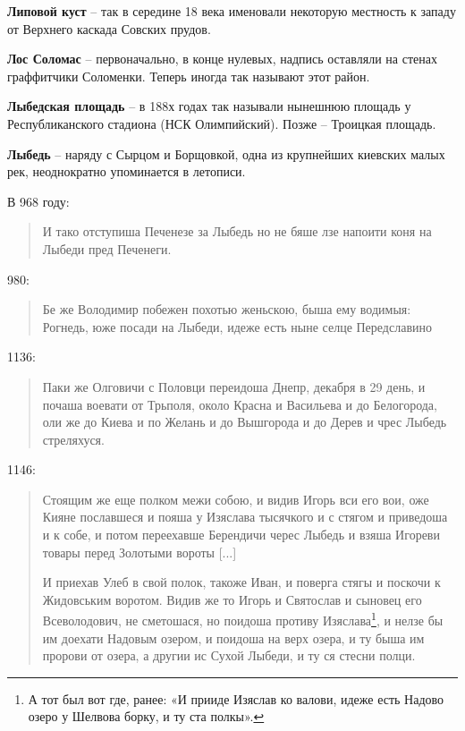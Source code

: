 \medskip

\textbf{Липовой куст} – так в середине 18 века именовали некоторую местность к западу от Верхнего каскада Совских прудов.\\

\medskip

\textbf{Лос Соломас} – первоначально, в конце нулевых, надпись оставляли на стенах граффитчики Соломенки. Теперь иногда так называют этот район.\\

\medskip

\textbf{Лыбедская площадь} – в 188х годах так называли нынешнюю площадь у Республиканского стадиона (НСК Олимпийский). Позже – Троицкая площадь.\\

\medskip


\textbf{Лыбедь} – наряду с Сырцом и Борщовкой, одна из крупнейших киевских малых рек, неоднократно упоминается в летописи.

В 968 году:

\begin{quotation}
\noindent И тако отступиша Печенезе за Лыбедь но не бяше лзе напоити коня на Лыбеди пред Печенеги.
\end{quotation}

980:

\begin{quotation}
\noindent Бе же Володимир побежен похотью женьскою, быша ему водимыя: Рогнедь, юже посади на Лыбеди, идеже есть ныне селце Передславино
\end{quotation}

1136:

\begin{quotation}
\noindent Паки же Олговичи с Половци переидоша Днепр, декабря в 29 день, и почаша воевати от Трьполя, около Красна и Васильева и до Белогорода, оли же до Киева и по Желань и до Вышгорода и до Дерев и чрес Лыбедь стреляхуся.
\end{quotation}

1146:

\begin{quotation}
\noindent Стоящим же еще полком межи собою, и видив Игорь вси его вои, оже Кияне пославшеся и пояша у Изяслава тысячкого и с стягом и приведоша и к собе, и потом переехавше Берендичи черес Лыбедь и взяша Игореви товары перед Золотыми вороты [...]

И приехав Улеб в свой полок, такоже Иван, и поверга стягы и поскочи к Жидовським воротом. Видив же то Игорь и Святослав и сыновец его Всеволодович, не сметошася, но поидоша противу Изяслава\footnote{А тот был вот где, ранее: «И прииде Изяслав ко валови, идеже есть Надово озеро у Шелвова борку, и ту ста полкы».}, и нелзе бы им доехати Надовым озером, и поидоша на верх озера, и ту быша им пророви от озера, а другии ис Сухой Лыбеди, и ту ся стесни полци.
\end{quotation} 


